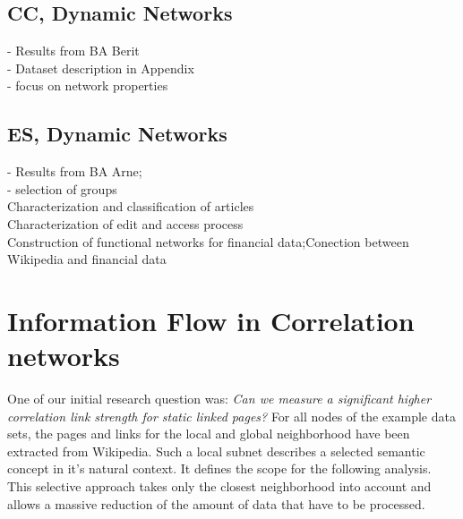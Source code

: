 \documentclass[a4paper,10pt]{scrbook}
\begin{document}
%


\label{ext.fig.Fig11E1a2}



\label{ext.fig.Fig11E1a9}



\label{ext.fig.Fig11E1a10}


\label{ext.fig.Fig11E1b9}



\label{ext.fig.Fig11E1b10}





\label{ext.fig.Fig11E2}








\subsection{CC, Dynamic Networks}

- Results from BA Berit \\
- Dataset description in Appendix \\
- focus on network properties \\

\subsection{ES, Dynamic Networks}
- Results from BA Arne; \\
- selection of groups \\
Characterization and classification of articles \\
Characterization of edit and access process  \\
Construction of functional networks for financial data;Conection between Wikipedia and financial data \\
 



\section{Information Flow in Correlation networks}
One of our initial research question was: \textit{Can we measure a
significant
higher correlation link strength for static linked pages?} For all nodes of the
example data sets, the pages and links for the local and
global neighborhood have been extracted from Wikipedia. Such a local subnet
describes a selected semantic concept in it's natural context. It defines the
scope for the following analysis. This selective approach takes only the
closest neighborhood into account and allows a massive reduction of the amount
of data that have to be processed.
\end{document}
